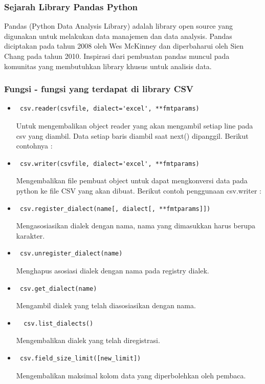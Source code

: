 \subsubsection{Sejarah Library Pandas Python}
Pandas (Python Data Analysis Library) adalah library open source yang digunakan untuk melakukan data manajemen dan data analysis. Pandas diciptakan pada tahun 2008 oleh Wes McKinney dan diperbaharui oleh Sien Chang pada tahun 2010. Inspirasi dari pembuatan pandas muncul pada komunitas yang membutuhkan library khusus untuk analisis data. 
\subsubsection{Fungsi - fungsi yang terdapat di library CSV}
\begin{itemize}
	\item \begin{verbatim} csv.reader(csvfile, dialect='excel', **fmtparams) \end{verbatim} Untuk mengembalikan	object reader yang akan mengambil setiap line pada csv yang diambil. Data setiap baris diambil saat next() dipanggil. Berikut contohnya : 
	\item \begin{verbatim} csv.writer(csvfile, dialect='excel', **fmtparams) \end{verbatim} Mengembalikan file pembuat object untuk dapat mengkonversi data pada python ke file CSV yang akan dibuat. Berikut contoh penggunaan csv.writer : 
	\item \begin{verbatim} csv.register_dialect(name[, dialect[, **fmtparams]]) \end{verbatim} Mengasosiasikan dialek dengan nama, nama yang dimasukkan harus berupa karakter.
	\item \begin{verbatim} csv.unregister_dialect(name) \end{verbatim}
	Menghapus asosiasi dialek dengan nama pada registry dialek.
	\item \begin{verbatim} csv.get_dialect(name) \end{verbatim}
	Mengambil dialek yang telah diasosiasikan dengan nama. 
	\item \begin{verbatim}  csv.list_dialects() \end{verbatim} Mengembalikan dialek yang telah diregistrasi.
	\item \begin{verbatim} csv.field_size_limit([new_limit]) \end{verbatim} Mengembalikan maksimal kolom data yang diperbolehkan oleh pembaca.
\end{itemize}
